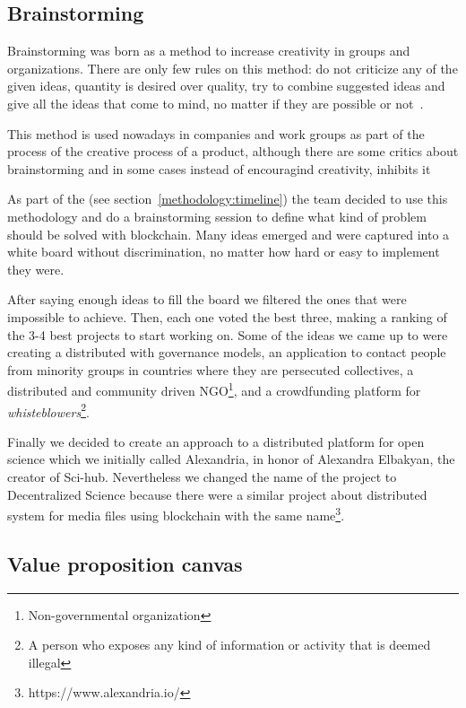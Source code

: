 \subsection{Brainstorming}

Brainstorming was born as a method to increase creativity in groups and
organizations. There are only few rules on this method: do not criticize any of
the given ideas, quantity is desired over quality, try to combine suggested
ideas and give all the ideas that come to mind, no matter if they are possible
or not~\cite{osborn1953applied}.

This method is used nowadays in companies and work groups as part of the process
of the creative process of a product, although there are some critics about
brainstorming and in some cases instead of encouragind creativity, inhibits
it~\cite{sutton1996brainstorming,mullen1991productivity}

As part of the (see section~\ref{methodology:timeline}) the team
decided to use this methodology and do a brainstorming session to define what
kind of problem should be solved with blockchain. Many ideas emerged and were
captured into a white board without discrimination, no matter how hard or easy to
implement they were.

After saying enough ideas to fill the board we filtered the ones that were
impossible to achieve. Then, each one voted the best three, making a ranking of
the 3-4 best projects to start working on. Some of the ideas we came up to were
creating a distributed  with governance models, an application to
contact people from minority groups in countries where they are persecuted
collectives, a distributed and community driven NGO\footnote{Non-governmental
  organization}, and a crowdfunding platform for \emph{whisteblowers}\footnote{A
  person who exposes any kind of information or activity that is deemed
  illegal}.

Finally we decided to create an approach to a distributed platform for open
science which we initially called Alexandria, in honor of Alexandra Elbakyan,
the creator of Sci-hub. Nevertheless we changed the name of the project to
Decentralized Science because there were a similar project about distributed
system for media files using blockchain with the same
name\footnote{https://www.alexandria.io/}.

\subsection{Value proposition canvas}
\label{sec:value-prop-canv}

